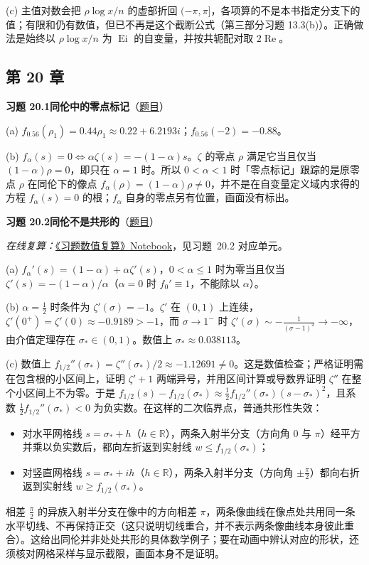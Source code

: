 \documentclass[11pt,a4paper]{article}
\DeclareMathOperator{\Ei}{Ei}
\newcommand{\RR}{\mathbb{R}}
\renewcommand{\Re}{\operatorname{Re}}
\newcommand{\Sol}[2]{%
  \par\addvspace{1.2em}\noindent
  \hypertarget{s:#1}{}\textbf{习题 #1\quad #2}\hfill{\small（\hyperlink{q:#1}{题目}）}\par
  \nopagebreak\smallskip}
\begin{document}
(c) 主值对数会把 $\rho\log x/n$ 的虚部折回 $(-\pi,\pi]$，各项算的不是本书指定分支下的值；有限和仍有数值，但已不再是这个截断公式（第三部分习题 13.3(b)）。正确做法是始终以 $\rho\log x/n$ 为 $\Ei$ 的自变量，并按共轭配对取 $2\Re$。

\subsection*{第 20 章}

\Sol{20.1}{同伦中的零点标记}
(a) $f_{0.56}(\rho_1)=0.44\rho_1\approx0.22+6.2193i$；$f_{0.56}(-2)=-0.88$。

(b) $f_\alpha(s)=0\iff\alpha\zeta(s)=-(1-\alpha)s$。$\zeta$ 的零点 $\rho$ 满足它当且仅当 $(1-\alpha)\rho=0$，即只在 $\alpha=1$ 时。所以 $0<\alpha<1$ 时「零点标记」跟踪的是原零点 $\rho$ 在同伦下的像点 $f_\alpha(\rho)=(1-\alpha)\rho\neq0$，并不是在自变量定义域内求得的方程 $f_\alpha(s)=0$ 的根；$f_\alpha$ 自身的零点另有位置，画面没有标出。

\Sol{20.2}{同伦不是共形的}
\emph{在线复算：}\href{https://colab.research.google.com/github/lichengtong123/lichengtong-RH/blob/main/\%E4\%B9\%A0\%E9\%A2\%98\%E4\%B8\%8E\%E8\%A7\%A3\%E7\%AD\%94/\%E4\%B9\%A0\%E9\%A2\%98\%E6\%95\%B0\%E5\%80\%BC\%E5\%A4\%8D\%E7\%AE\%97.ipynb}{《习题数值复算》Notebook}，见习题~20.2 对应单元。

(a) $f_\alpha'(s)=(1-\alpha)+\alpha\zeta'(s)$，$0<\alpha\le1$ 时为零当且仅当 $\zeta'(s)=-(1-\alpha)/\alpha$（$\alpha=0$ 时 $f_0'\equiv1$，不能除以 $\alpha$）。

(b) $\alpha=\frac12$ 时条件为 $\zeta'(\sigma)=-1$。$\zeta'$ 在 $(0,1)$ 上连续，$\zeta'(0^+)=\zeta'(0)\approx-0.9189>-1$，而 $\sigma\to1^-$ 时 $\zeta'(\sigma)\sim-\frac1{(\sigma-1)^2}\to-\infty$，由介值定理存在 $\sigma_*\in(0,1)$。数值上 $\sigma_*\approx0.038113$。

(c) 数值上 $f_{1/2}''(\sigma_*)=\zeta''(\sigma_*)/2\approx-1.12691\ne0$。这是数值检查；严格证明需在包含根的小区间上，证明 $\zeta'+1$ 两端异号，并用区间计算或导数界证明 $\zeta''$ 在整个小区间上不为零。于是 $f_{1/2}(s)-f_{1/2}(\sigma_*)\approx\frac12f_{1/2}''(\sigma_*)(s-\sigma_*)^2$，且系数 $\frac12f_{1/2}''(\sigma_*)<0$ 为负实数。在这样的二次临界点，普通共形性失效：
\begin{itemize}
  \item 对水平网格线 $s=\sigma_*+h$（$h\in\RR$），两条入射半分支（方向角 $0$ 与 $\pi$）经平方并乘以负实数后，都向左折返到实射线 $w\le f_{1/2}(\sigma_*)$；
  \item 对竖直网格线 $s=\sigma_*+ih$（$h\in\RR$），两条入射半分支（方向角 $\pm\frac\pi2$）都向右折返到实射线 $w\ge f_{1/2}(\sigma_*)$。
\end{itemize}
相差 $\frac\pi2$ 的异族入射半分支在像中的方向相差 $\pi$，两条像曲线在像点处共用同一条水平切线、不再保持正交（这只说明切线重合，并不表示两条像曲线本身彼此重合）。这给出同伦并非处处共形的具体数学例子；要在动画中辨认对应的形状，还须核对网格采样与显示截限，画面本身不是证明。
\end{document}
